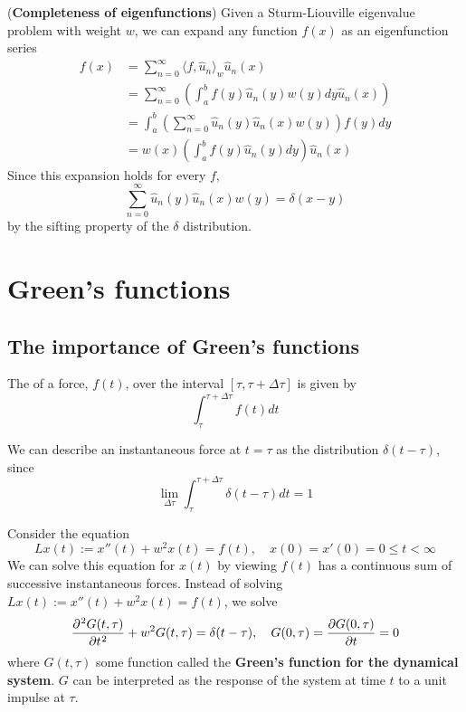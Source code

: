 \begin{proposition}
	(\textbf{Completeness of eigenfunctions}) Given a Sturm-Liouville eigenvalue problem with weight $w$, we can expand any function $f(x)$ as an eigenfunction series
	\[
		\begin{aligned}
			f(x) & = \sum_{n = 0}^{\infty} {\langle f, \hat{u}_n \rangle}_w \hat{u}_n(x) \\
			& = \sum_{n = 0}^{\infty} \left( \int_{a}^{b} f(y) \hat{u}_n (y) w(y) dy \hat{u}_n(x) \right) \\
			& = \int_{a}^{b} \left( \sum_{n = 0}^{\infty} \hat{u}_n(y) \hat{u}_n(x) w(y) \right) f(y) dy \\
			& = w(x) \left( \int_{a}^{b} f(y) \hat{u}_n(y) dy \right) \hat{u}_n(x)
		\end{aligned}
	\]
	Since this expansion holds for every $f$,
	\[
		\sum_{n = 0}^{\infty} \hat{u}_n(y) \hat{u}_n(x) w(y) = \delta(x - y)
	\]
	by the sifting property of the $\delta$ distribution.
\end{proposition}

\section{Green's functions}

\subsection{The importance of Green's functions}

\begin{definition}
	The  of a force, $f(t)$, over the interval $[\tau, \tau + \Delta \tau]$ is given by
	\[
		\int_{\tau}^{\tau + \Delta \tau} f(t) dt
	\]
\end{definition}

\begin{definition}
	We can describe an instantaneous force at $t = \tau$ as the distribution $\delta(t - \tau)$, since
	\[
		\lim_{\Delta \tau} \int_{\tau}^{\tau + \Delta \tau} \delta(t - \tau) dt = 1
	\]
\end{definition}

\begin{definition}\label{def:greensFunction}
	Consider the equation
	\[
		L x(t) := x''(t) + w^2 x(t) = f(t), \quad x(0) = x'(0) = 0 \le t < \infty
	\]
	We can solve this equation for $x(t)$ by viewing $f(t)$ has a continuous sum of successive instantaneous forces. Instead of solving $L x(t) := x''(t) + w^2 x(t) = f(t)$, we solve
	\[
		\diffp[2]{G(t, \tau)}{t} + w^2 G(t, \tau) = \delta(t - \tau), \quad G(0, \tau) = \diffp{G(0, \tau)}{t} = 0
	\]
	where $G(t, \tau)$ some function called the \textbf{Green's function for the dynamical system}. $G$ can be interpreted as the response of the system at time $t$ to a unit impulse at $\tau$.
\end{definition}

